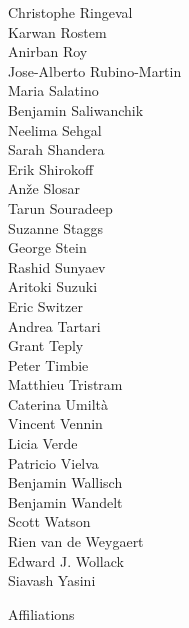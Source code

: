 \documentclass[PICOReport.tex]{subfiles}
\begin{document}
{\begin{multicols}{4}
Christophe Ringeval             \\
Karwan Rostem                   \\
Anirban Roy                     \\
Jose-Alberto Rubino-Martin      \\
Maria Salatino                  \\
Benjamin Saliwanchik            \\
Neelima Sehgal                  \\
Sarah Shandera                  \\
Erik Shirokoff                  \\
An\v{z}e Slosar                 \\
Tarun Souradeep                 \\
Suzanne Staggs                  \\
George Stein                    \\
Rashid Sunyaev                  \\
Aritoki Suzuki                  \\
Eric Switzer                    \\
Andrea Tartari                  \\
Grant Teply                     \\
Peter Timbie                    \\
Matthieu Tristram               \\
Caterina Umilt\`{a}             \\
Vincent Vennin                  \\
Licia Verde                     \\
Patricio Vielva                 \\
Benjamin Wallisch               \\
Benjamin Wandelt                \\
Scott Watson                    \\
Rien van de Weygaert            \\
Edward J. Wollack               \\
Siavash Yasini
\end{multicols}
}

\newpage
\Large  {\centerline {Affiliations}}
\end{document}
